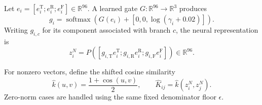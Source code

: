 \documentclass[pdflatex,sn-mathphys-num]{sn-jnl}
\newcommand{\1}{\mathbf{1}}
\theoremstyle{plain}
\begin{document}
	Let $e_i=[e_i^{\mathrm{T}};e_i^{\mathrm{R}};e_i^{\mathrm{F}}]\in\mathbb{R}^{96}$.
	A learned gate $G:\mathbb{R}^{96}\rightarrow\mathbb{R}^3$ produces
	\begin{equation}
		g_i
		=
		\operatorname{softmax}\!\left(
		G(e_i)
		+
		[0,0,\log(\gamma_i+0.02)]
		\right).
		\label{eq:gateweights}
	\end{equation}
	Writing $g_{i,c}$ for its component associated with branch $c$, the
	neural representation is
	\begin{equation}
		z_i^N
		=
		P\!\left(
		[
		g_{i,\mathrm{T}}e_i^{\mathrm{T}};
		g_{i,\mathrm{R}}e_i^{\mathrm{R}};
		g_{i,\mathrm{F}}e_i^{\mathrm{F}}
		]
		\right)
		\in\mathbb{R}^{96}.
		\label{eq:gate}
	\end{equation}
	
	For nonzero vectors, define the shifted cosine similarity
	\begin{equation}
		\widehat k(u,v)
		=
		\frac{1+\cos(u,v)}{2},
		\qquad
		\widehat K_{ij}
		=
		\widehat k(z_i^N,z_j^N).
		\label{eq:studentsimilarity}
	\end{equation}
	Zero-norm cases are handled using the same fixed denominator floor
	$\epsilon$.
	
\end{document}
